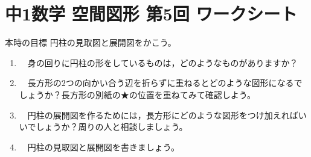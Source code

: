 \documentclass[fontsize=12pt,platex,dvipdfmx,standalone]{jlreq}			%
\theoremstyle{definition}
\begin{document}
\section*{中1数学 空間図形 第5回 ワークシート}
\vspace{-15.2mm}

\begin{itembox}[l]{本時の目標}
  円柱の見取図と展開図をかこう。
\end{itembox}

\vspace{-3mm}

\begin{enumerate}

  \item 　身の回りに円柱の形をしているものは，どのようなものがありますか？
    \begin{screen}
      \vspace{6mm}
    \end{screen}

  \item 　長方形の$2$つの向かい合う辺を折らずに重ねるとどのような図形になるでしょうか？長方形の別紙の★の位置を重ねてみて確認しよう。
  
    \vspace{2mm}
    \begin{center}
      \begin{adjustbox}{center}
      \end{adjustbox}
    \end{center}

  \item 　円柱の展開図を作るためには，長方形にどのような図形をつけ加えればいいでしょうか？周りの人と相談しましょう。
    \begin{screen}
      \vspace{7mm}
    \end{screen}

  \item 　円柱の見取図と展開図を書きましょう。

    \begin{center}
      \begin{adjustbox}{center}
\end{adjustbox}
\end{center}
\end{enumerate}
\end{document}
